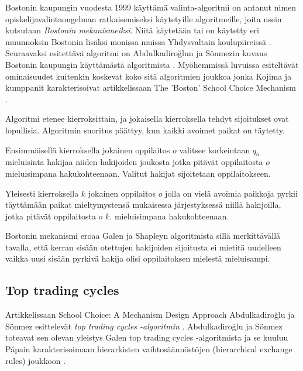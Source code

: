 \documentclass[twoside]{tktltiki}
\begin{document}
Bostonin kaupungin vuodesta 1999 käyttämä valinta-algoritmi on antanut
nimen opiskelijavalintaongelman ratkaisemiseksi käytetyille
algoritmeille, joita usein kutsutaan \emph{Bostonin mekanismeiksi}.
Niitä käytetään tai on käytetty eri muunnoksin Bostonin lisäksi
monissa muissa Yhdysvaltain koulupiireissä \cite{abduson03}.
Seuraavaksi esitettävä algoritmi on Abdulkadiroğlun ja Sönmezin kuvaus
Bostonin kaupungin käyttämästä algoritmista \cite{abduson03}.
Myöhemmissä luvuissa esiteltävät ominaisuudet kuitenkin koskevat koko
sitä algoritmien joukkoa jonka Kojima ja kumppanit karakterisoivat
artikkelissaan The 'Boston' School Choice Mechanism \cite{kojima10}.

Algoritmi etenee kierroksittain, ja jokaisella kierroksella tehdyt
sijoitukset ovat lopullisia. Algoritmin suoritus päättyy, kun kaikki
avoimet paikat on täytetty.

\begin{itemize*}
\item Ensimmäisellä kierroksella jokainen oppilaitos $o$ valitsee
  korkeintaan $q_o$ mieluisinta hakijaa niiden hakijoiden joukosta
  jotka pitävät oppilaitosta $o$ mieluisimpana hakukohteenaan. Valitut
  hakijat sijoitetaan oppilaitokseen.

\item Yleisesti kierroksella $k$ jokainen oppilaitos $o$ jolla on
  vielä avoimia paikkoja pyrkii täyttämään paikat mieltymystensä
  mukaisessa järjestyksessä niillä hakijoilla, jotka pitävät
  oppilaitosta $o$ $k.$ mieluisimpana hakukohteenaan.
\end{itemize*}

Bostonin mekanismi eroaa Galen ja Shapleyn algoritmista sillä
merkittävällä tavalla, että kerran sisään otettujen hakijoiden
sijoitusta ei mietitä uudelleen vaikka uusi sisään pyrkivä hakija
olisi oppilaitoksen mielestä mieluisampi.

\subsection{Top trading cycles}
\label{top_trading_cycles}

Artikkelissaan School Choice: A Mechanism Design Approach
Abdulkadiroğlu ja Sönmez esittelevät \emph{top trading cycles
  -algoritmin} \cite{abduson03}. Abdulkadiroğlu ja Sönmez toteavat sen
olevan yleistys Galen top trading cycles -algoritmista
\cite{shapley74} ja se kuuluu Pápain karakterisoimaan hierarkisten
vaihtosäännöstöjen (hierarchical exchange rules) joukkoon
\cite{papai00}.
\newpage
\end{document}
